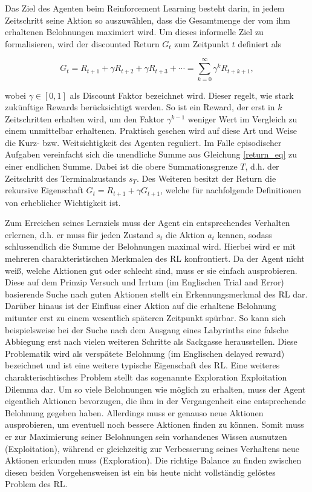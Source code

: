 Das Ziel des Agenten beim Reinforcement Learning besteht darin, in jedem Zeitschritt seine Aktion so auszuwählen, dass die Gesamtmenge der vom ihm erhaltenen Belohnungen maximiert wird. Um dieses informelle Ziel zu formalisieren, wird der discounted Return $G_t$ zum Zeitpunkt $t$ definiert als

\begin{equation}
  G_t = R_{t+1} + \gamma R_{t+2} + \gamma R_{t+3} + \dotsb = \sum_{k=0}^{\infty} \gamma^k R_{t+k+1},
  \label{return_eq}
\end{equation}

wobei $\gamma \in [0, 1]$ als Discount Faktor bezeichnet wird. Dieser regelt, wie stark zukünftige Rewards berücksichtigt werden. So ist ein Reward, der erst in $k$ Zeitschritten erhalten wird, um den Faktor $\gamma^{k-1}$ weniger Wert im Vergleich zu einem unmittelbar erhaltenen. Praktisch gesehen wird auf diese Art und Weise die Kurz- bzw. Weitsichtigkeit des Agenten reguliert. Im Falle episodischer Aufgaben vereinfacht sich die unendliche Summe aus Gleichung \eqref{return_eq} zu einer endlichen Summe. Dabei ist die obere Summationsgrenze $T$, d.h. der Zeitschritt des Terminalzustands $s_T$. Des Weiteren besitzt der Return die rekursive Eigenschaft $G_t = R_{t+1} + \gamma G_{t+1}$, welche für nachfolgende Definitionen von erheblicher Wichtigkeit ist.

Zum Erreichen seines Lernziels muss der Agent ein entsprechendes Verhalten erlernen, d.h. er muss für jeden Zustand $s_t$ die Aktion $a_t$ kennen, sodass schlussendlich die Summe der Belohnungen maximal wird. Hierbei wird er mit mehreren charakteristischen Merkmalen des RL konfrontiert. Da der Agent nicht weiß, welche Aktionen gut oder schlecht sind, muss er sie einfach ausprobieren. Diese auf dem Prinzip Versuch und Irrtum (im Englischen Trial and Error) basierende Suche nach guten Aktionen stellt ein Erkennungsmerkmal des RL dar. Darüber hinaus ist der Einfluss einer Aktion auf die erhaltene Belohnung mitunter erst zu einem wesentlich späteren Zeitpunkt spürbar. So kann sich beispielsweise bei der Suche nach dem Ausgang eines Labyrinths eine falsche Abbiegung erst nach vielen weiteren Schritte als Sackgasse herausstellen. Diese Problematik wird als verspätete Belohnung (im Englischen delayed reward) bezeichnet und ist eine weitere typische Eigenschaft des RL. Eine weiteres charakterischtisches Problem stellt das sogenannte Exploration Exploitation Dilemma dar. Um so viele Belohnungen wie möglich zu erhalten, muss der Agent eigentlich Aktionen bevorzugen, die ihm in der Vergangenheit eine entsprechende Belohnung gegeben haben. Allerdings muss er genauso neue Aktionen ausprobieren, um eventuell noch bessere Aktionen finden zu können. Somit muss er zur Maximierung seiner Belohnungen sein vorhandenes Wissen ausnutzen (Exploitation), während er gleichzeitig zur Verbesserung seines Verhaltens neue Aktionen erkunden muss (Exploration). Die richtige Balance zu finden zwischen diesen beiden Vorgehensweisen ist ein bis heute nicht vollständig gelöstes Problem des RL.

